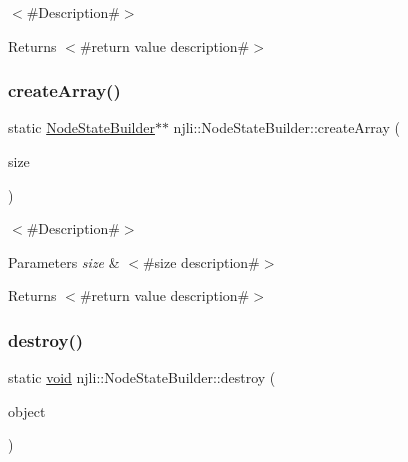 $<$\#\+Description\#$>$

\begin{DoxyReturn}{Returns}
$<$\#return value description\#$>$ 
\end{DoxyReturn}
\mbox{\label{classnjli_1_1_node_state_builder_a3e2258c717172451b12ccfc4d25c1af7}} 
\subsubsection{\texorpdfstring{create\+Array()}{createArray()}}
{\footnotesize\ttfamily static \mbox{\hyperlink{classnjli_1_1_node_state_builder}{Node\+State\+Builder}}$\ast$$\ast$ njli\+::\+Node\+State\+Builder\+::create\+Array (\begin{DoxyParamCaption}\item[{const \mbox{\hyperlink{_util_8h_a10e94b422ef0c20dcdec20d31a1f5049}{u32}}}]{size }\end{DoxyParamCaption})\hspace{0.3cm}{\ttfamily [static]}}

$<$\#\+Description\#$>$


\begin{DoxyParams}{Parameters}
{\em size} & $<$\#size description\#$>$\\
\hline
\end{DoxyParams}
\begin{DoxyReturn}{Returns}
$<$\#return value description\#$>$ 
\end{DoxyReturn}
\mbox{\label{classnjli_1_1_node_state_builder_a5439375062a47f970758dc92d56cf1c2}} 
\subsubsection{\texorpdfstring{destroy()}{destroy()}}
{\footnotesize\ttfamily static \mbox{\hyperlink{_thread_8h_af1e856da2e658414cb2456cb6f7ebc66}{void}} njli\+::\+Node\+State\+Builder\+::destroy (\begin{DoxyParamCaption}\item[{\mbox{\hyperlink{classnjli_1_1_node_state_builder}{Node\+State\+Builder}} $\ast$}]{object }\end{DoxyParamCaption})\hspace{0.3cm}{\ttfamily [static]}}

